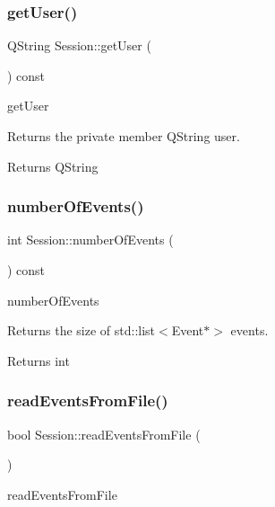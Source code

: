 \subsubsection{\texorpdfstring{get\+User()}{getUser()}}
{\footnotesize\ttfamily Q\+String Session\+::get\+User (\begin{DoxyParamCaption}{ }\end{DoxyParamCaption}) const}



get\+User 

Returns the private member Q\+String user. \begin{DoxyReturn}{Returns}
Q\+String 
\end{DoxyReturn}
\mbox{\label{class_session_aa6766de9b237384f6eff9ccbdfd8bde9}} 
\subsubsection{\texorpdfstring{number\+Of\+Events()}{numberOfEvents()}}
{\footnotesize\ttfamily int Session\+::number\+Of\+Events (\begin{DoxyParamCaption}{ }\end{DoxyParamCaption}) const}



number\+Of\+Events 

Returns the size of std\+::list$<$\+Event$\ast$$>$ events. \begin{DoxyReturn}{Returns}
int 
\end{DoxyReturn}
\mbox{\label{class_session_aff9fd19eb09a0ac22d3e2c2615f9f9e9}} 
\subsubsection{\texorpdfstring{read\+Events\+From\+File()}{readEventsFromFile()}}
{\footnotesize\ttfamily bool Session\+::read\+Events\+From\+File (\begin{DoxyParamCaption}{ }\end{DoxyParamCaption})}



read\+Events\+From\+File 

